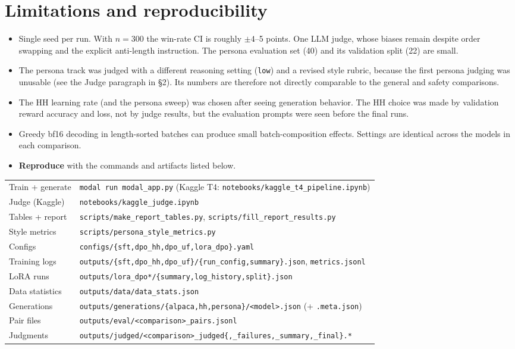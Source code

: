 \documentclass[10pt]{article}
\newcommand{\code}[1]{\texttt{\small #1}}
\begin{document}
\section{Limitations and reproducibility}
\begin{itemize}
\item Single seed per run. With $n{=}300$ the win-rate CI is roughly $\pm4$--5 points. One LLM judge, whose biases remain despite
order swapping and the explicit anti-length instruction. The persona evaluation set (40) and its validation split (22) are small.
\item The persona track was judged with a different reasoning setting (\code{low}) and a revised style rubric, because the first
persona judging was unusable (see the Judge paragraph in \S2). Its numbers are therefore not directly comparable to the general and safety comparisons.
\item The HH learning rate (and the persona sweep) was chosen after seeing generation behavior. The HH choice was made by validation reward
accuracy and loss, not by judge results, but the evaluation prompts were seen before the final runs.
\item Greedy bf16 decoding in length-sorted batches can produce small batch-composition effects. Settings are identical
across the models in each comparison.
\item \textbf{Reproduce} with the commands and artifacts listed below.
\end{itemize}
\begin{center}\footnotesize
\begin{tabular}{@{}ll@{}}
\toprule
Train + generate & \code{modal run modal\_app.py} \quad (Kaggle T4: \code{notebooks/kaggle\_t4\_pipeline.ipynb}) \\
Judge (Kaggle) & \code{notebooks/kaggle\_judge.ipynb} \\
Tables + report & \code{scripts/make\_report\_tables.py}, \code{scripts/fill\_report\_results.py} \\
Style metrics & \code{scripts/persona\_style\_metrics.py} \\
\midrule
Configs & \code{configs/\{sft,dpo\_hh,dpo\_uf,lora\_dpo\}.yaml} \\
Training logs & \code{outputs/\{sft,dpo\_hh,dpo\_uf\}/\{run\_config,summary\}.json}, \code{metrics.jsonl} \\
LoRA runs & \code{outputs/lora\_dpo*/\{summary,log\_history,split\}.json} \\
Data statistics & \code{outputs/data/data\_stats.json} \\
Generations & \code{outputs/generations/\{alpaca,hh,persona\}/<model>.json} (+ \code{.meta.json}) \\
Pair files & \code{outputs/eval/<comparison>\_pairs.jsonl} \\
Judgments & \code{outputs/judged/<comparison>\_judged\{,\_failures,\_summary,\_final\}.*} \\
\bottomrule
\end{tabular}
\end{center}
\end{document}
